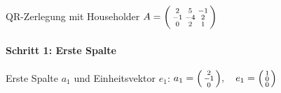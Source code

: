 \begin{example2}[breakable]{QR-Zerlegung mit Householder}
$A = \begin{psmallmatrix}
2 & 5 & -1\\
-1 & -4 & 2\\
0 & 2 & 1
\end{psmallmatrix}$

\paragraph{Schritt 1: Erste Spalte}
Erste Spalte $a_1$ und Einheitsvektor $e_1$:
$a_1 = \begin{psmallmatrix} 2\\ -1\\ 0 \end{psmallmatrix}, \quad e_1 = \begin{psmallmatrix} 1\\ 0\\ 0 \end{psmallmatrix}$


\end{example2}
